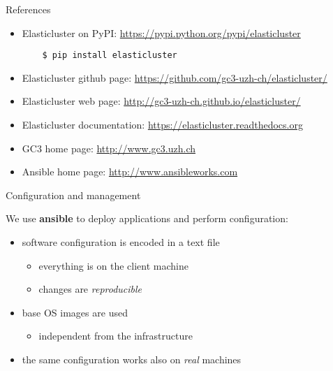 \documentclass[english,serif,mathserif,usenames,dvipsnames]{beamer}
\begin{document}
\begin{frame}[fragile]
  {References}
  \begin{itemize}
  \item Elasticluster on PyPI:
    \url{https://pypi.python.org/pypi/elasticluster}

\begin{verbatim}
    $ pip install elasticluster
\end{verbatim}

  \item Elasticluster github page: 
    \url{https://github.com/gc3-uzh-ch/elasticluster/}
  \item Elasticluster web page: 
    \url{http://gc3-uzh-ch.github.io/elasticluster/}
  \item Elasticluster documentation:
    \url{https://elasticluster.readthedocs.org}
  \item GC3 home page: \url{http://www.gc3.uzh.ch}
  \item Ansible home page: \url{http://www.ansibleworks.com}
  \end{itemize}
\end{frame}

\begin{frame}
  {Configuration and management}

  We use \textbf{ansible} to deploy applications and perform
  configuration:
  \begin{itemize}
  \item software configuration is encoded in a text file
    \begin{itemize}
    \item everything is on the client machine
    \item changes are \textit{reproducible} 
    \end{itemize}
  \item base OS images are used
    \begin{itemize}
    \item independent from the infrastructure
    \end{itemize}
  \item the same configuration works also on \textit{real} machines
  \end{itemize}

\end{frame}
\end{document}
